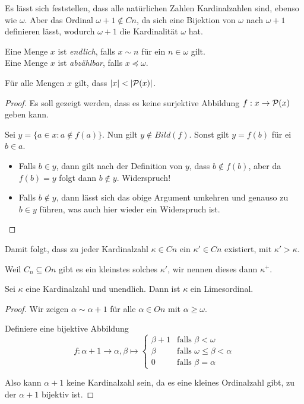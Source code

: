 Es lässt sich feststellen, dass alle natürlichen Zahlen Kardinalzahlen sind, ebenso wie $\omega$. Aber das Ordinal $\omega+1\notin Cn$, da sich eine Bijektion von $\omega$ nach $\omega+1$ definieren lässt, wodurch $\omega+1$ die Kardinalität $\omega$ hat.

\begin{definition}
	Eine Menge $x$ ist \textit{endlich}, falls $x\sim n$ für ein $n\in \omega$ gilt.
	\\
	Eine Menge $x$ ist \textit{abzählbar}, falls $x\preceq \omega$.
\end{definition}

\begin{satz}[Cantor]
	Für alle Mengen $x$ gilt, dass $\vert x \vert <\vert \mathcal{P}(x)\vert$.
	\label{SatzVonCantor}
\end{satz}
\begin{proof}
	Es soll gezeigt werden, dass es keine surjektive Abbildung $f:x\to\mathcal{P}(x)$ geben kann.
	
	Sei $y=\{a\in x : a\notin f(a)\}$. Nun gilt $y\notin Bild(f)$. Sonst gilt $y=f(b)$ für ei $b\in a$.
	\begin{itemize}
		\item Falls $b\in y$, dann gilt nach der Definition von $y$, dass $b\notin f(b)$, aber da $f(b)=y$ folgt dann $b\notin y$. Widerspruch!
		\item Falls $b\notin y$, dann lässt sich das obige Argument umkehren und genauso zu $b\in y$ führen, was auch hier wieder ein Widerspruch ist.
	\end{itemize}
\end{proof}

Damit folgt, dass zu jeder Kardinalzahl $\kappa\in Cn$ ein $\kappa'\in Cn$ existiert, mit $\kappa'>\kappa$.

Weil $C_n\subseteq On$ gibt es ein kleinstes solches $\kappa'$, wir nennen dieses dann $\kappa^+$.

\begin{lemma}
	Sei $\kappa$ eine Kardinalzahl und unendlich. Dann ist $\kappa$ ein Limesordinal.
\end{lemma}
\begin{proof}
	Wir zeigen $\alpha\sim \alpha+1$ für alle $\alpha\in On$ mit $\alpha \geq \omega$.
	
	Definiere eine bijektive Abbildung 
	$$f:\alpha+1\to \alpha, \beta \mapsto
		\begin{cases}
			\beta+1 & \text{falls } \beta <\omega \\
			\beta & \text{falls } \omega \leq \beta < \alpha \\
			0 & \text{falls } \beta=\alpha
		\end{cases}$$
	
	Also kann $\alpha+1$ keine Kardinalzahl sein, da es eine kleines Ordinalzahl gibt, zu der $\alpha+1$ bijektiv ist.
\end{proof}

